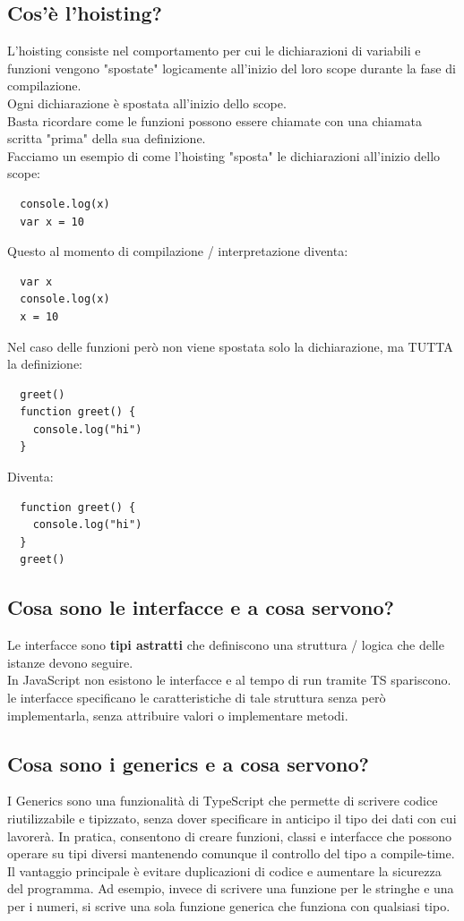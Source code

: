 \documentclass[12pt]{article}
\begin{document}
\subsection{Cos’è l’hoisting?}
L'hoisting consiste nel comportamento per cui le dichiarazioni di variabili e funzioni vengono "spostate" logicamente all'inizio del loro scope durante la fase di compilazione.\\
Ogni dichiarazione è spostata all'inizio dello scope.\\
Basta ricordare come le funzioni possono essere chiamate con una chiamata scritta "prima" della sua definizione.\\
Facciamo un esempio di come l'hoisting "sposta" le dichiarazioni all'inizio dello scope:
\begin{lstlisting}
  console.log(x)
  var x = 10
\end{lstlisting}
Questo al momento di compilazione / interpretazione diventa:
\begin{lstlisting}
  var x
  console.log(x)
  x = 10
\end{lstlisting}
Nel caso delle funzioni però non viene spostata solo la dichiarazione, ma TUTTA la definizione:
\begin{lstlisting}
  greet()
  function greet() {
    console.log("hi")
  }
\end{lstlisting}
Diventa:
\begin{lstlisting}
  function greet() {
    console.log("hi")
  }
  greet()
\end{lstlisting}

\subsection{Cosa sono le interfacce e a cosa servono?}
Le interfacce sono \textbf{tipi astratti} che definiscono una struttura / logica che delle istanze devono seguire.\\
In JavaScript non esistono le interfacce e al tempo di run tramite TS spariscono.\\
le interfacce specificano le caratteristiche di tale struttura senza però implementarla, senza attribuire valori o implementare metodi.\\

\subsection{Cosa sono i generics e a cosa servono?}
I Generics sono una funzionalità di TypeScript che permette di scrivere codice riutilizzabile e tipizzato, senza dover specificare in anticipo il tipo dei dati con cui lavorerà. In pratica, consentono di creare funzioni, classi e interfacce che possono operare su tipi diversi mantenendo comunque il controllo del tipo a compile-time.\\
Il vantaggio principale è evitare duplicazioni di codice e aumentare la sicurezza del programma. Ad esempio, invece di scrivere una funzione per le stringhe e una per i numeri, si scrive una sola funzione generica che funziona con qualsiasi tipo.
\end{document}
